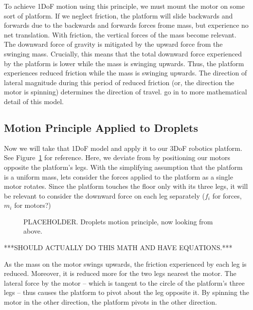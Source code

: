 \documentclass[letterpaper, 10pt, conference]{ieeeconf}
\begin{document}
To achieve 1DoF motion using this principle, we must mount the motor on some sort of platform. If we neglect friction, the platform will slide backwards and forwards due to the backwards and forwards forces frome mass, but experience no net translation. With friction, the vertical forces of the mass become relevant. The downward force of gravity is mitigated by the upward force from the swinging mass. Crucially, this means that the total downward force experienced by the platform is lower while the mass is swinging upwards. Thus, the platform experiences reduced friction while the mass is swinging upwards. The direction of lateral magnitude during this period of reduced friction (or, the direction the motor is spinning) determines the direction of travel. \cite{Vartholomeos2005,Vartholomeos2006} go in to more mathematical detail of this model.

\subsection{Motion Principle Applied to Droplets}

Now we will take that 1DoF model and apply it to our 3DoF robotics platform. See Figure~\ref{dropletMotorDiagram} for reference. Here, we deviate from \cite{Vartholomeos2005} by positioning our motors opposite the platform's legs. With the simplifying assumption that the platform is a uniform mass, lets consider the forces applied to the platform as a single motor rotates. Since the platform touches the floor only with its three legs, it will be relevant to consider the downward force on each leg separately ($f_i$ for forces, $m_i$ for motors?)

\begin{figure}
\centering
\caption{PLACEHOLDER. Droplets motion principle, now looking from above.}
\label{dropletMotorDiagram}
\end{figure}

***SHOULD ACTUALLY DO THIS MATH AND HAVE EQUATIONS.***

As the mass on the motor swings upwards, the friction experienced by each leg is reduced. Moreover, it is reduced more for the two legs nearest the motor. The lateral force by the motor -- which is tangent to the circle of the platform's three legs -- thus causes the platform to pivot about the leg opposite it. By spinning the motor in the other direction, the platform pivots in the other direction.
\end{document}

